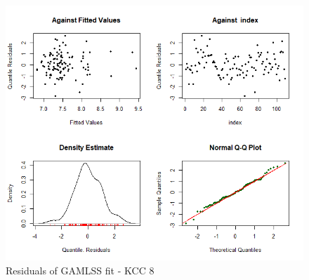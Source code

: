 \begin{figure}[H]
\centering
  \includegraphics[width=0.95\linewidth]{figures/gamlss_residuals_kcc_8.png}
  \caption{Residuals of GAMLSS fit - KCC 8}
  \label{fig:gamlss_residuals_kcc_8}
\end{figure}





